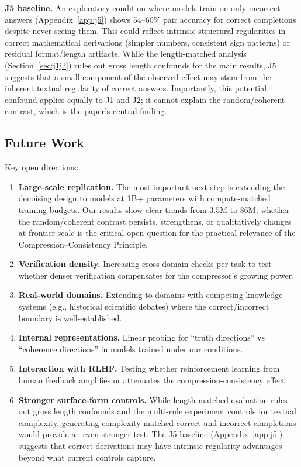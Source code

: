 \documentclass[10pt]{article} %
\begin{document}
\textbf{J5 baseline.} An exploratory condition where models train on only incorrect answers (Appendix~\ref{app:j5}) shows 54--60\% pair accuracy for correct completions despite never seeing them. This could reflect intrinsic structural regularities in correct mathematical derivations (simpler numbers, consistent sign patterns) or residual format/length artifacts. While the length-matched analysis (Section~\ref{sec:j1j2}) rules out gross length confounds for the main results, J5 suggests that a small component of the observed effect may stem from the inherent textual regularity of correct answers. Importantly, this potential confound applies equally to J1 and J2; it cannot explain the random/coherent contrast, which is the paper's central finding.

\subsection{Future Work}

Key open directions:

\begin{enumerate}
    \item \textbf{Large-scale replication.} The most important next step is extending the denoising design to models at 1B+ parameters with compute-matched training budgets. Our results show clear trends from 3.5M to 86M; whether the random/coherent contrast persists, strengthens, or qualitatively changes at frontier scale is the critical open question for the practical relevance of the Compression--Consistency Principle.
    \item \textbf{Verification density.} Increasing cross-domain checks per task to test whether denser verification compensates for the compressor's growing power.
    \item \textbf{Real-world domains.} Extending to domains with competing knowledge systems (e.g., historical scientific debates) where the correct/incorrect boundary is well-established.
    \item \textbf{Internal representations.} Linear probing for ``truth directions'' vs ``coherence directions'' \citep{marks2023geometry} in models trained under our conditions.
    \item \textbf{Interaction with RLHF.} Testing whether reinforcement learning from human feedback amplifies or attenuates the compression-consistency effect.
    \item \textbf{Stronger surface-form controls.} While length-matched evaluation rules out gross length confounds and the multi-rule experiment controls for textual complexity, generating complexity-matched correct and incorrect completions would provide an even stronger test. The J5 baseline (Appendix~\ref{app:j5}) suggests that correct derivations may have intrinsic regularity advantages beyond what current controls capture.
\end{enumerate}
\end{document}
